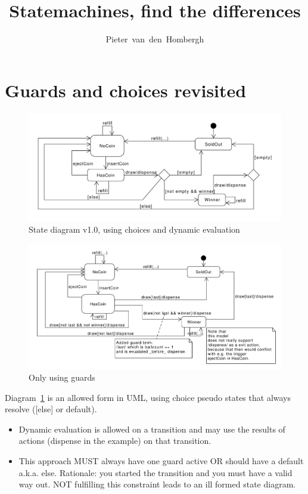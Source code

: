 
\author{Pieter~van~den~Hombergh}
\title{Statemachines, find the differences}


\section*{Guards and choices revisited}
\begin{figure}\centering
  \includegraphics[width=.9\linewidth]{figures/statemachine}
  \caption{\label{d1}State diagram v1.0, using choices and
    dynamic evaluation}
\end{figure}

\begin{figure}\centering
  \includegraphics[width=.9\linewidth]{figures/statemachine3}
  \caption{\label{d2}Only using guards}
\end{figure}

Diagram~\ref{d1} is an allowed form in UML, using choice pseudo states that
always resolve ([else] or default).
\
\begin{itemize}
\item Dynamic evaluation is allowed on a transition and may use the results
  of actions (dispense in the example) on that transition.
\item This approach MUST always have one guard active OR should have a
  default a.k.a. else. Rationale: you started the transition and you
  must have a valid way out. NOT fulfilling this constraint leads to an
  ill formed state diagram.
\end{itemize}



